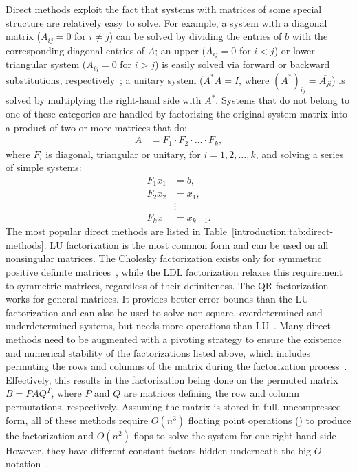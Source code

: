 Direct methods exploit the fact that systems with matrices of some special
structure are relatively easy to solve. For example, a system with a diagonal
matrix ($A_{ij} = 0$ for $i \neq j$) can be solved by dividing the entries of
$b$ with the corresponding diagonal entries of $A$; an upper ($A_{ij} = 0$ for
$i < j$) or lower triangular system ($A_{ij} = 0$ for $i > j$) is easily solved
via forward or backward substitutions, respectively~\cite{demmel,Ipsen2009}; a
unitary system ($A^* A = I$, where $(A^*)_{ij} = \overline{A_{ji}}$)
is solved by multiplying the right-hand side with $A^*$.  Systems that do not
belong to one of these categories are handled by factorizing the original system
matrix into a product of two or more matrices that do:
\begin{align}
    A &= F_1 \cdot F_2 \cdot \ldots \cdot F_k,
\end{align}
where $F_i$ is diagonal, triangular or unitary, for $i = 1,2, \ldots, k$, and
solving a series of simple systems:
\begin{align}
    F_1 x_1 &= b,\\
    F_2 x_2 &= x_1,\\
    &\vdots \nonumber \\
    F_k x &= x_{k-1}.
\end{align}
The most popular direct methods are listed in
Table~\ref{introduction:tab:direct-methods}. LU factorization is the most common
form and can be used on all nonsingular matrices. The Cholesky factorization
exists only for symmetric positive definite matrices~\cite{demmel}, while the
LDL factorization relaxes this requirement to symmetric matrices, regardless of
their definiteness. The QR factorization works for general matrices. It provides
better error bounds than the LU factorization and can also be used to solve
non-square, overdetermined and underdetermined systems, but needs more
operations than LU~\cite{demmel}.  Many direct methods need to be augmented with
a pivoting strategy to ensure the existence and numerical stability of the
factorizations listed above, which includes permuting the rows and columns of
the matrix during the
factorization process~\cite{demmel,duff}. Effectively, this results
in the factorization being done on the permuted matrix $B = P A Q^T$, where $P$
and $Q$ are matrices defining the row and column permutations, respectively.
Assuming the matrix is stored in full, uncompressed form, all of these methods
require $O(n^3)$ floating point operations () to produce the
factorization and $O(n^2)$ flops to solve the system for one right-hand side
However, they have different constant factors hidden underneath the big-$O$
notation~\cite{big-o}.

